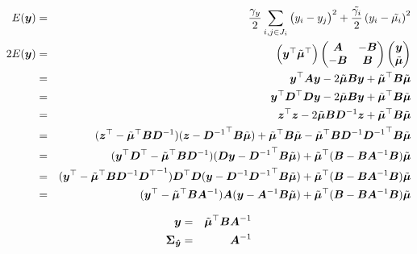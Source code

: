 \documentclass[platex, a4paper]{jsarticle}
\begin{document}
\begin{eqnarray}
  E(\bm{y})
    &=& \dfrac {\gamma_y} {2} \sum_{i,j\in{J_i}} \left(y_i - y_j \right)^2
      + \dfrac {\tilde{\gamma_i}} {2} \left( y_{i} - \tilde {\mu_i} \right) ^{2}\\
  2E(\bm{y})
    &=& \begin{pmatrix} \bm{y} ^\top  \tilde{\bm{\mu}}^\top \end{pmatrix}
        \begin{pmatrix}
            \bm{A} & -\bm{B} \\
            -\bm{B} & \bm{B}
        \end{pmatrix}
        \begin{pmatrix}
          \bm{y}  \\
          \tilde{\bm{\mu}}
        \end{pmatrix} \\
    &=& \bm{y} ^\top \bm{A} \bm{y}  - 2 \tilde{\bm{\mu}} \bm{B} \bm{y}
        + \tilde{\bm{\mu}}^\top \bm{B} \tilde{\bm{\mu}} \\
    &=& \bm{y} ^\top \bm{D}^{\top} \bm{D} \bm{y}  - 2 \tilde{\bm{\mu}} \bm{B} \bm{y}
        + \tilde{\bm{\mu}}^\top \bm{B} \tilde{\bm{\mu}} \\
    &=& \bm{z}^{\top}\bm{z} - 2 \tilde{\bm{\mu}} \bm{B} \bm{D}^{-1}\bm{z}  + \tilde{\bm{\mu}}^\top \bm{B} \tilde{\bm{\mu}} \\
    &=& (\bm{z}^{\top} - \tilde{\bm{\mu}}^{\top}\bm{B} \bm{D}^{-1}) (\bm{z} - {\bm{D}^{-1}}^\top \bm{B}   \tilde{\bm{\mu}})
    + \tilde{\bm{\mu}}^\top \bm{B} \tilde{\bm{\mu}} - \tilde{\bm{\mu}}^{\top}\bm{B} \bm{D}^{-1}
    {\bm{D}^{-1}}^\top \bm{B} \tilde{\bm{\mu}} \\
    &=& (\bm{y} ^\top \bm{D}^{\top} - \tilde{\bm{\mu}}^{\top}\bm{B} \bm{D}^{-1})(\bm{D}\bm{y}  - {\bm{D}^{-1}}^\top \bm{B} \tilde{\bm{\mu}}) + \tilde{\bm{\mu}}^\top (\bm{B} - \bm{B} \bm{A}^{-1} \bm{B} ) \tilde{\bm{\mu}} \\
    &=&  (\bm{y} ^{\top} - \tilde{\bm{\mu}}^{\top}\bm{B} \bm{D}^{-1} {\bm{D}^{\top}}^{-1}) \bm{D}^{\top} \bm{D} (\bm{y}  - \bm{D}^{-1}{\bm{D}^{-1}}^\top \bm{B} \tilde{\bm{\mu}}) + \tilde{\bm{\mu}}^\top (\bm{B} - \bm{B} \bm{A}^{-1} \bm{B} ) \tilde{\bm{\mu}} \\
    &=& (\bm{y} ^{\top} - \tilde{\bm{\mu}}^{\top}\bm{B} \bm{A}^{-1}) \bm{A} (\bm{y}  - \bm{A}^{-1} \bm{B} \tilde{\bm{\mu}})
    + \tilde{\bm{\mu}}^\top (\bm{B} - \bm{B} \bm{A}^{-1} \bm{B} ) \tilde{\bm{\mu}}
\end{eqnarray}

\begin{eqnarray}
  \bm{y} &=& \tilde{\bm{\mu}}^{\top}\bm{B} \bm{A}^{-1} \\
  \bm{\Sigma_{\hat{y}}} &=& \bm{A}^{-1}
\end{eqnarray}
\end{document}
